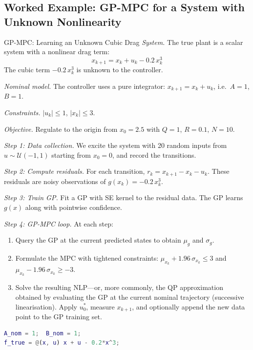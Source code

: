 \subsection{Worked Example: GP-MPC for a System with Unknown Nonlinearity}
\label{sec:gpmpc_example}

\begin{examplebox}{GP-MPC: Learning an Unknown Cubic Drag}
	\emph{System.} The true plant is a scalar system with a nonlinear drag term:
	\[
	x_{k+1} = x_k + u_k - 0.2\,x_k^3
	\]
	The cubic term $-0.2\,x_k^3$ is unknown to the controller.

	\emph{Nominal model.} The controller uses a pure integrator: $x_{k+1} = x_k + u_k$, i.e.\ $A = 1$, $B = 1$.

	\emph{Constraints.} $|u_k| \le 1$, $|x_k| \le 3$.

	\emph{Objective.} Regulate to the origin from $x_0 = 2.5$ with $Q = 1$, $R = 0.1$, $N = 10$.

	\solution

	\emph{Step 1: Data collection.} We excite the system with 20 random inputs from $u \sim \mathcal{U}(-1, 1)$ starting from $x_0 = 0$, and record the transitions.

	\emph{Step 2: Compute residuals.} For each transition, $r_k = x_{k+1} - x_k - u_k$. These residuals are noisy observations of $g(x_k) = -0.2\,x_k^3$.

	\emph{Step 3: Train GP.} Fit a GP with SE kernel to the residual data. The GP learns $g(x)$ along with pointwise confidence.

	\emph{Step 4: GP-MPC loop.} At each step:
	\begin{enumerate}[noitemsep]
		\item Query the GP at the current predicted states to obtain $\mu_g$ and $\sigma_g$.
		\item Formulate the MPC with tightened constraints: $\mu_{x_k} + 1.96\,\sigma_{x_k} \le 3$ and $\mu_{x_k} - 1.96\,\sigma_{x_k} \ge -3$.
		\item Solve the resulting NLP---or, more commonly, the QP approximation obtained by evaluating the GP at the current nominal trajectory (successive linearisation). Apply $u_0^*$, measure $x_{k+1}$, and optionally append the new data point to the GP training set.
	\end{enumerate}

\begin{lstlisting}[language=Matlab, caption={GP-MPC for a scalar system with unknown cubic drag.}]
% 1. True Plant and Nominal Model
A_nom = 1;  B_nom = 1;
f_true = @(x, u) x + u - 0.2*x^3;


\end{lstlisting}
\end{examplebox}
